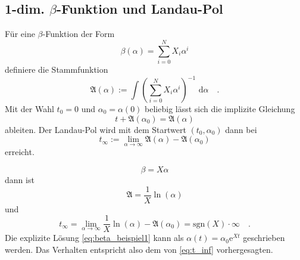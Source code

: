	\subsection{1-dim. $\beta$-Funktion und Landau-Pol}
		
		Für eine $\beta$-Funktion der Form 
		\begin{equation}
		\beta(\alpha)=\sum\limits_{i=0}^N X_i \alpha^i
		\end{equation}
		definiere die Stammfunktion
		\begin{equation}
		\mathfrak{A}(\alpha):=\int \left( \sum\limits_{i=0}^N X_i 
		\alpha^i\right)^{-1} \text{ d}\alpha \quad .
		\end{equation}
		Mit der Wahl $t_0=0$ und $\alpha_0=\alpha(0)$ beliebig lässt 
		sich die implizite Gleichung
		\begin{equation}
		t+\mathfrak{A}(\alpha_0)=\mathfrak{A}(\alpha)
		\end{equation}
		ableiten. Der Landau-Pol wird mit dem Startwert $(t_0,
		\alpha_0)$ dann bei 
		\begin{equation}
		t_\infty := \lim\limits_{\alpha\to \infty}\mathfrak{A}(\alpha)
		 - \mathfrak{A}
		(\alpha_0) \label{eq:t_inf}
		\end{equation}
		erreicht.
		
		\begin{example}
			\begin{equation}
			\beta = X \alpha \label{eq:beta_beispiel1}
			\end{equation}
			dann ist 
			\begin{equation}
			\mathfrak{A}=\frac{1}{X}\ln(\alpha)
			\end{equation}
			und 
			\begin{equation}
			t_\infty = \lim\limits_{\alpha\to\infty} \frac1X 
			\ln(\alpha) -\mathfrak{A}(\alpha_0) = \text{sgn}(X) 
			\cdot \infty \quad .
			\end{equation}
			Die explizite Lösung \eqref{eq:beta_beispiel1} kann 
			als $\alpha(t)=\alpha_0 \text{e}^{Xt}$ geschrieben werden. 
			Das Verhalten entspricht also dem von \eqref{eq:t_inf} 
			vorhergesagten.
		\end{example}
		
